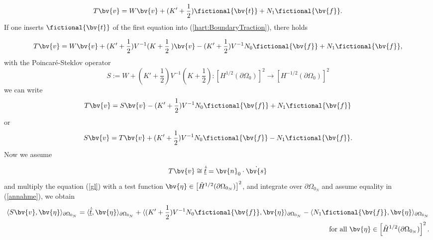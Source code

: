 \begin{equation}
T\bv{v}=W\bv{v}+(K'+\frac{1}{2})\fictional{\bv{t}}+N_{1}\fictional{\bv{f}}.\nonumber
\end{equation}
If one inserts $\fictional{\bv{t}}$ of the first equation into (\ref{hart:BoundaryTraction}), there holds 

\begin{equation*}
T\bv{v}=W\bv{v}+(K'+\frac{1}{2})V^{-1}(K+\frac{1}{2}\:)\bv{v}-(K'+\frac{1}{2})V^{-1}N_{0}\fictional{\bv{f}}+N_{1}\fictional{\bv{f}},
\end{equation*}
with the  Poincar\'e-Steklov operator
\begin{equation}
S:=W+(K'+\frac{1}{2})V^{-1}(K+\frac{1}{2}):\left[H^{1/2}(\partial{\Omega_0})\right]^{2}\rightarrow\left[H^{-1/2}(\partial{\Omega_0})\right]^{2}\nonumber
\end{equation}
we can write 
\begin{equation}\nonumber
T\bv{v}=S\bv{v}-(K'+\frac{1}{2})V^{-1}N_{0}\fictional{\bv{f}}+N_{1}\fictional{\bv{f}}
\end{equation} 
or
\begin{equation}\nonumber
S\bv{v}=T\bv{v}+(K'+\frac{1}{2})V^{-1}N_{0}\fictional{\bv{f}}-N_{1}\fictional{\bv{f}}\label{gl}.
\end{equation} 
Now we assume 

\begin{equation}
T\bv{v}\cong\underline{\dot{\tilde{t}}}=\bv{n}_{0}\cdot\dot{\bv{s}}\label{annahme}
\end{equation} 
and multiply the equation (\ref{gl}) with a test function  $ \bv{\eta}\in \left[ \tilde{H}^{1/2}(\partial{\Omega_{0_N}})\right] ^{2}$, and integrate over  $\partial{\Omega_{0_N}}$ and  assume equality in (\ref{annahme}), we obtain
\begin{eqnarray}
\langle S\bv{v}, \bv{\eta}\rangle _{\partial{\Omega_{0_N}}}=\langle \underline{\dot{\tilde{t}}}, \bv{\eta}\rangle_{\partial{\Omega_{0_N}}}+\langle (K'+\frac{1}{2})V^{-1}N_{0}\fictional{\bv{f}}, \bv{\eta}\rangle_{\partial{\Omega_{0_N}}}-\langle N_{1}\fictional{\bv{f}}, \bv{\eta}\rangle_{\partial{\Omega_{0_N}}}\nonumber\\
 \qquad \textnormal{for all  }  \bv{\eta}\in \left[ \tilde{H}^{1/2}(\partial{\Omega_{0_N}})\right] ^{2}.\nonumber
\end{eqnarray} 

